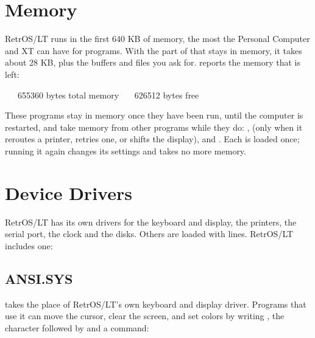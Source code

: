 \section{Memory}

RetrOS/LT runs in the first 640 KB of memory, the most the Personal
Computer and XT can have for programs. With the part of  that stays in memory, it takes
about 28 KB, plus the buffers and files you ask for.  reports the memory that is left:

\begin{dialogue}
\ \ \ 655360 bytes total memory
\ \ \ 626512 bytes free
\end{dialogue}

These programs stay in memory once they have been run, until the computer
is restarted, and take memory from other programs while they do:
,  (only when it reroutes a printer, retries one,
or shifts the display),  and . Each is loaded
once; running it again changes its settings and takes no more memory.

\section{Device Drivers}

RetrOS/LT has its own drivers for the keyboard and display, the printers,
the serial port, the clock and the disks. Others are loaded with
 lines. RetrOS/LT includes one:

\subsection{ANSI.SYS}  takes the place of RetrOS/LT's own
keyboard and display driver. Programs that use it can move the cursor,
clear the screen, and set colors by writing , the
character  followed by \typed{[} and a command:

